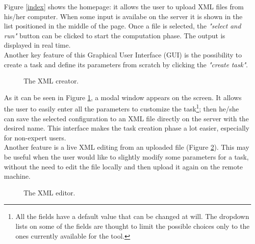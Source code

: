 Figure \ref{index} shows the homepage: it allows the user to upload XML files from his/her computer. When some input is availabe on the server it is shown in the list positioned in the middle of the page. Once a file is selected, the \emph{"select and run"} button can be clicked to start the computation phase. The output is displayed in real time.\\
Another key feature of this Graphical User Interface (GUI) is the possibility to create a task and define its parameters from scratch by clicking the \emph{"create task"}.

\begin{figure}[H]
  \caption{The XML creator.}
  \label{modal}
\end{figure}  

As it can be seen in Figure \ref{modal}, a modal window appears on the screen. It allows the user to easily enter all the parameters to customize the task\footnote{All the fields have a default value that can be changed at will. The dropdown lists on some of the fields are thought to limit the possible choices only to the ones currently available for the tool.}; then he/she can save the selected configuration to an XML file directly on the server with the desired name. This interface makes the task creation phase a lot easier, especially for non-expert users.\\
Another feature is a live XML editing from an uploaded file (Figure \ref{editor}). This may be useful when the user would like to slightly modify some parameters for a task, without the need to edit the file locally and then upload it again on the remote machine.

\begin{figure}[H]
  \caption{The XML editor.}
  \label{editor}
\end{figure}  